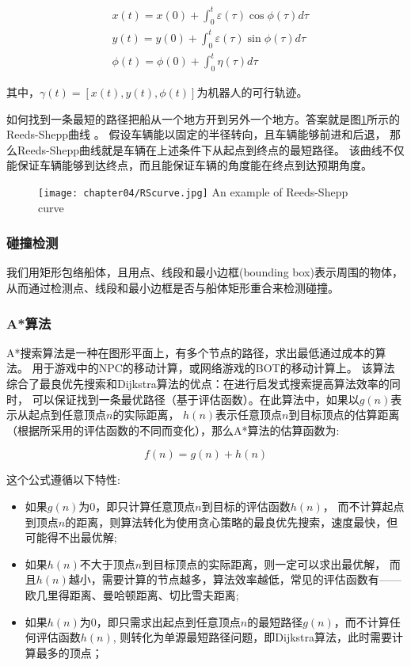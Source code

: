 \begin{equation}
  \begin{aligned}
    & x(t)=x(0)+\int_0^t \varepsilon( \tau ) \cos \phi (\tau) d \tau   \\
    & y(t)=y(0)+\int_0^t \varepsilon( \tau ) \sin \phi (\tau) d \tau   \\
    & \phi (t)= \phi (0) + \int_0^t \eta (\tau) d \tau
  \end{aligned}
\end{equation}

其中，$\gamma(t)=[x(t), y(t), \phi(t)]$为机器人的可行轨迹。

如何找到一条最短的路径把船从一个地方开到另外一个地方。答案就是图\ref{fig:rscurve}所示的
Reeds-Shepp曲线\cite{reeds1990} 。
假设车辆能以固定的半径转向，且车辆能够前进和后退，
那么Reeds-Shepp曲线就是车辆在上述条件下从起点到终点的最短路径。
该曲线不仅能保证车辆能够到达终点，而且能保证车辆的角度能在终点到达预期角度。


\begin{figure}[!htp]
  \centering
  \texttt{[image: chapter04/RScurve.jpg]}
    {An example of Reeds-Shepp curve}
  \label{fig:rscurve}
\end{figure}


\subsubsection{碰撞检测}
我们用矩形包络船体，且用点、线段和最小边框(bounding box)表示周围的物体，
从而通过检测点、线段和最小边框是否与船体矩形重合来检测碰撞。


\subsubsection{A*算法}
A*搜索算法是一种在图形平面上，有多个节点的路径，求出最低通过成本的算法。
用于游戏中的NPC的移动计算，或网络游戏的BOT的移动计算上。
该算法综合了最良优先搜索和Dijkstra算法的优点：在进行启发式搜索提高算法效率的同时，
可以保证找到一条最优路径（基于评估函数）。在此算法中，如果以$g(n)$表示从起点到任意顶点$n$的实际距离，
$h(n)$表示任意顶点$n$到目标顶点的估算距离（根据所采用的评估函数的不同而变化），那么A*算法的估算函数为:

\begin{equation}
  f(n)=g(n)+h(n)
\end{equation}

这个公式遵循以下特性:
\begin{itemize}
  \item 
  如果$g(n)$为0，即只计算任意顶点$n$到目标的评估函数$h(n)$，
  而不计算起点到顶点$n$的距离，则算法转化为使用贪心策略的最良优先搜索，速度最快，但可能得不出最优解;
  \item 
  如果$h(n)$不大于顶点$n$到目标顶点的实际距离，则一定可以求出最优解，
  而且$h(n)$越小，需要计算的节点越多，算法效率越低，常见的评估函数有——欧几里得距离、曼哈顿距离、切比雪夫距离;
  \item 
  如果$h(n)$为0，即只需求出起点到任意顶点$n$的最短路径$g(n)$，而不计算任何评估函数$h(n)$, 
  则转化为单源最短路径问题，即Dijkstra算法，此时需要计算最多的顶点；
\end{itemize}


